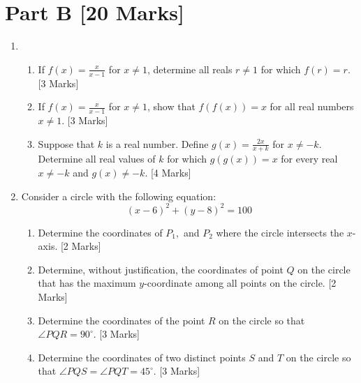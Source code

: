 \documentclass[12pt]{article}
\begin{document}
\section*{Part B [20 Marks]}
\begin{enumerate}
    \item 
    \begin{enumerate}
        \item If $f(x) = \displaystyle{\frac{x}{x - 1}}$ for $x \neq 1$, determine all reals $r \neq 1$ for which $f(r) = r$.  [3 Marks]
        
        \item If $f(x) = \displaystyle{\frac{x}{x - 1}}$ for $x \neq 1$, show that $f(f(x)) = x$ for all real numbers $x \neq 1$. [3 Marks]
        
        \item Suppose that $k$ is a real number. Define $g(x) = \displaystyle{\frac{2x}{x + k}}$ for $x \neq -k$. Determine all real values of $k$ for which $g(g(x)) = x$ for every real $x \neq -k$ and $g(x) \neq -k$. [4 Marks]
    \end{enumerate} \newpage

    \item Consider a circle with the following equation:
    \begin{equation*}
        (x - 6)^2 + (y - 8)^2 = 100
    \end{equation*}
    \begin{enumerate}
        \item Determine the coordinates of $P_1, $ and $P_2$ where the circle intersects the $x$-axis. [2 Marks]
        
        \item Determine, without justification, the coordinates of point $Q$ on the circle that has the maximum $y$-coordinate among all points on the circle. [2 Marks]
        
        \item Determine the coordinates of the point $R$ on the circle so that $\angle PQR = 90^{\circ}$. [3 Marks]
        
        \item Determine the coordinates of two distinct points $S$ and $T$ on the circle so that $\angle PQS = \angle PQT = 45^{\circ}$. [3 Marks]
    \end{enumerate}
\end{enumerate}
\end{document}

